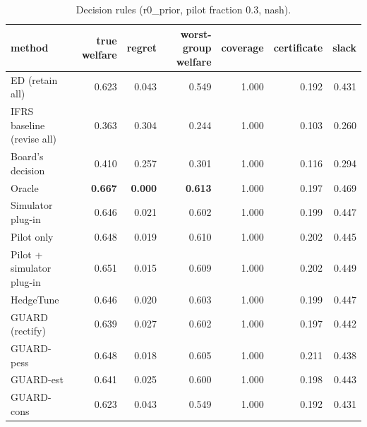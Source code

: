 \begin{table}[t]
\centering
\small
\begin{tabular}{lrrrrrr}
\toprule
method & true welfare & regret & worst-group welfare & coverage & certificate & slack \\
\midrule
ED (retain all) & 0.623 & 0.043 & 0.549 & 1.000 & 0.192 & 0.431 \\
IFRS baseline (revise all) & 0.363 & 0.304 & 0.244 & 1.000 & 0.103 & 0.260 \\
Board's decision & 0.410 & 0.257 & 0.301 & 1.000 & 0.116 & 0.294 \\
Oracle & \textbf{0.667} & \textbf{0.000} & \textbf{0.613} & 1.000 & 0.197 & 0.469 \\
Simulator plug-in & 0.646 & 0.021 & 0.602 & 1.000 & 0.199 & 0.447 \\
Pilot only & 0.648 & 0.019 & 0.610 & 1.000 & 0.202 & 0.445 \\
Pilot + simulator plug-in & 0.651 & 0.015 & 0.609 & 1.000 & 0.202 & 0.449 \\
HedgeTune & 0.646 & 0.020 & 0.603 & 1.000 & 0.199 & 0.447 \\
GUARD (rectify) & 0.639 & 0.027 & 0.602 & 1.000 & 0.197 & 0.442 \\
GUARD-pess & 0.648 & 0.018 & 0.605 & 1.000 & 0.211 & 0.438 \\
GUARD-est & 0.641 & 0.025 & 0.600 & 1.000 & 0.198 & 0.443 \\
GUARD-cons & 0.623 & 0.043 & 0.549 & 1.000 & 0.192 & 0.431 \\
\bottomrule
\end{tabular}
\caption{Decision rules (r0\_prior, pilot fraction 0.3, nash).}
\label{tab:methods-nash}
\end{table}
